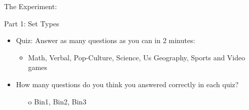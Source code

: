 \documentclass[aspectratio=169]{beamer}
\begin{document}


\begin{frame}{The Experiment:}

Part 1: Set Types\\
\bigskip
\begin{itemize}
    \item Quiz: Answer as many questions as you can in 2 minutes:\\
    \begin{itemize}
        \item Math, Verbal, Pop-Culture, Science, Us Geography, Sports and Video games\\
    \end{itemize}
    \bigskip
    \item How many questions do you think you answered correctly in each quiz?\\
    \begin{itemize}
        \item[o] Bin1, Bin2, Bin3
    \end{itemize}
\end{itemize}

\end{frame}



\end{document}
\end{frame}
\end{document}
\end{frame}
\end{document}
